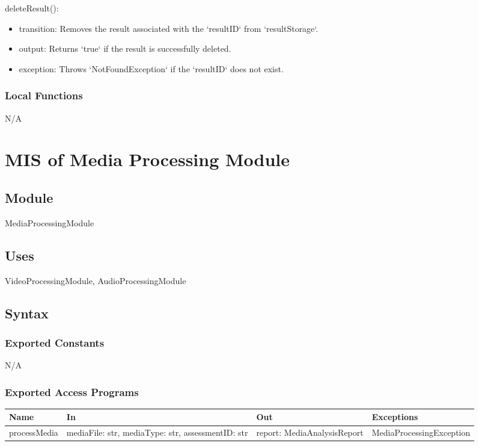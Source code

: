 \documentclass[12pt, titlepage]{article}
\begin{document}
\noindent deleteResult():
\begin{itemize}
\item transition: Removes the result associated with the `resultID` from `resultStorage`.
\item output: Returns `true` if the result is successfully deleted.
\item exception: Throws `NotFoundException` if the `resultID` does not exist.
\end{itemize}

\subsubsection{Local Functions}

N/A
\section{MIS of Media Processing Module} \label{MediaProcessingModule}

\subsection{Module}
MediaProcessingModule

\subsection{Uses}
VideoProcessingModule, AudioProcessingModule

\subsection{Syntax}

\subsubsection{Exported Constants}
N/A

\subsubsection{Exported Access Programs}
\begin{center}
  \begin{tabular}{p{3cm} p{4cm} p{4cm} p{5cm}}
  \hline
  \textbf{Name} & \textbf{In} & \textbf{Out} & \textbf{Exceptions} \\
  \hline
  processMedia & \raggedright\arraybackslash mediaFile: str, mediaType: str, assessmentID: str & \raggedright\arraybackslash report: MediaAnalysisReport & \raggedright\arraybackslash MediaProcessingException \\
  \end{tabular}
\end{center}
\end{document}
